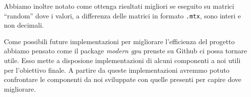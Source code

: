Abbiamo inoltre notato come \ScanTrans ottenga risultati migliori se eseguito su matrici ``random'' dove i valori, a differenza delle matrici in formato \texttt{.mtx}, sono interi e non decimali.

Come possibili future implementazioni per migliorare l'efficienza del progetto abbiamo pensato come il package \textit{modern gpu} prenste su Github ci possa tornare utile. Esso mette a disposione implementazioni di alcuni componenti a noi utili per l'obiettivo finale. A partire da queste implementazioni avremmo potuto confrontare le componenti da noi sviluppate con quelle presenti per capire dove migliorare. 



